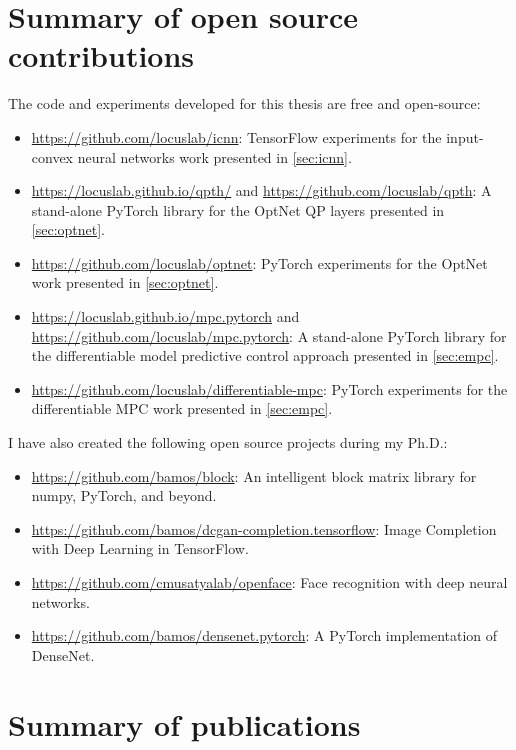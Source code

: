 \newpage
\section{Summary of open source contributions}
The code and experiments developed for this thesis
are free and open-source:

\begin{itemize}
\item \url{https://github.com/locuslab/icnn}:
  TensorFlow experiments for the input-convex neural networks
  work presented in \cref{sec:icnn}.
\item \url{https://locuslab.github.io/qpth/} and
  \url{https://github.com/locuslab/qpth}:
  A stand-alone PyTorch library for the OptNet QP layers presented
  in \cref{sec:optnet}.
\item \url{https://github.com/locuslab/optnet}:
  PyTorch experiments for the OptNet work
  presented in \cref{sec:optnet}.
\item \url{https://locuslab.github.io/mpc.pytorch}
  and \url{https://github.com/locuslab/mpc.pytorch}:
  A stand-alone PyTorch library for the differentiable
  model predictive control approach presented in
  \cref{sec:empc}.
\item \url{https://github.com/locuslab/differentiable-mpc}:
  PyTorch experiments for the differentiable MPC work
  presented in \cref{sec:empc}.
\end{itemize}

\vspace{5mm}
\noindent
I have also created the following open source
projects during my Ph.D.:
\begin{itemize}
\item \url{https://github.com/bamos/block}:
  An intelligent block matrix library for numpy, PyTorch, and beyond.
\item \url{https://github.com/bamos/dcgan-completion.tensorflow}:
  Image Completion with Deep Learning in TensorFlow.
\item \url{https://github.com/cmusatyalab/openface}:
  Face recognition with deep neural networks.
\item \url{https://github.com/bamos/densenet.pytorch}:
  A PyTorch implementation of DenseNet.
\end{itemize}

\newpage
\section{Summary of publications}
\newcommand{\fcite}[1]{
  \begin{leftbar}
  \begin{quote}%
    \citep{#1} \fullcite{#1}
  \end{quote}
  \end{leftbar}}

